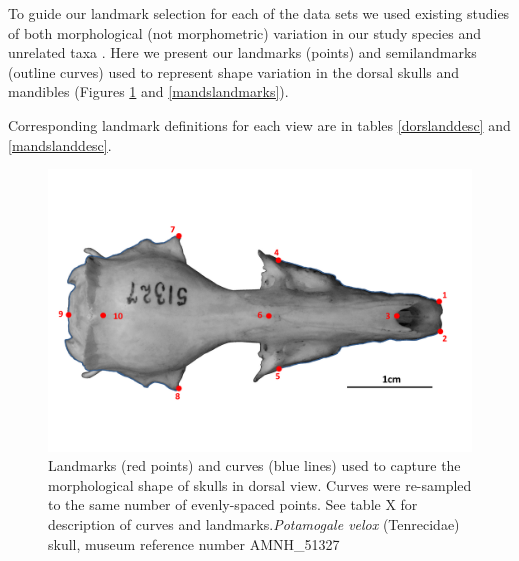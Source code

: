 \documentclass[12pt,a4paper]{article}
\begin{document}
To guide our landmark selection for each of the data sets we used existing studies of both morphological (not morphometric) variation in our study species \citep{Asher1999, Asher2008, Asher2010} and unrelated taxa \citep[e.g.][]{Barrow2008, Panchetti2008, Macholan2008, Klenovsek2013}. 
Here we present our landmarks (points) and semilandmarks (outline curves) used to represent shape variation in the dorsal skulls and mandibles (Figures \ref{dorslandmarks} and \ref{mandslandmarks}).

Corresponding landmark definitions for each view are in tables \ref{dorslanddesc} and \ref{mandslanddesc}.


\begin{figure}[H]
\centering
\includegraphics[width=1\linewidth]{AMNH_51327_dorsallandmarksdiagram.png}
\caption{Landmarks (red points) and curves (blue lines) used to capture the morphological shape of skulls in dorsal view. Curves were re-sampled to the same number of evenly-spaced points. See table X for description of curves and landmarks.\textit{Potamogale velox} (Tenrecidae) skull, museum reference number AMNH\_51327}
\label{dorslandmarks}
\end{figure}


\end{document}
